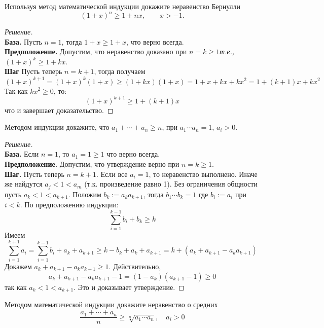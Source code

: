\begin{problem}
 Используя метод математической индукции докажите неравенство Бернулли
 \[
  (1+x)^n \geq 1 + nx, \qquad x > -1.
 \]
\end{problem}
 
\begin{proof}[Решение]~\\
\textbf{База.} Пусть \(n=1\), тогда \(1+x \geq 1+x\), что верно всегда.\\
\textbf{Предположение.} Допустим, что неравенство доказано при \(n=k\ge 1\)\textit{т.е.,} \((1+x)^k \geq 1 + kx\).\\
\textbf{Шаг} Пусть теперь \(n=k+1\), тогда получаем
\[
(1+x)^{k+1} = (1+x)^k (1+x) \geq (1 + kx)(1+x) = 1 + x + kx + kx^2 = 1 + (k+1)x + kx^2
\]
Так как \(kx^2 \geq 0\), то:
\[
(1+x)^{k+1} \geq 1 + (k+1)x
\] 
что и завершает доказательство.
\end{proof}

\begin{problem}
 Методом индукции докажите, что \(a_1 + \cdots + a_n \geq n\), при \(a_1 \cdots a_n = 1\), \(a_i > 0.\)
\end{problem}
\begin{proof}[Решение]~\\
\textbf{База.} Если \(n=1\), то \(a_1 = 1 \geq 1\) что верно всегда. \\
\textbf{Предположение.} Допустим, что утверждение верно при \(n=k \ge 1\). \\
\textbf{Шаг.} Пусть теперь \(n=k+1\). Если все \(a_i = 1\), то неравенство выполнено. Иначе же найдутся \(a_j < 1 < a_m\) (т.к. произведение равно 1). Без ограничения общности пусть \(a_k < 1 < a_{k+1}\). Положим \(b_k := a_k a_{k+1}\), тогда \(b_1 \cdots b_k = 1\) где \(b_i := a_i\) при \(i<k\). По предположению индукции:
\[
\sum_{i=1}^{k-1} b_i + b_k \geq k
\]
Имеем
\[
\sum_{i=1}^{k+1} a_i = \sum_{i=1}^{k-1} b_i + a_k + a_{k+1} \geq k - b_k + a_k + a_{k+1} = k + (a_k + a_{k+1} - a_k a_{k+1})
\]
Докажем \(a_k + a_{k+1} - a_k a_{k+1} \geq 1\). Действительно,
\[
a_k + a_{k+1} - a_k a_{k+1} - 1 = (1 - a_k)(a_{k+1} - 1) \geq 0
\]
так как \(a_k < 1 < a_{k+1}\). Это и доказывает утверждение.  
\end{proof}

\begin{problem}
    Методом математической индукции докажите неравенство о средних 
    \[
\frac{a_1 + \cdots + a_n}{n} \geq \sqrt[n]{a_1 \cdots a_n}, \quad a_i > 0
\]
\end{problem}

